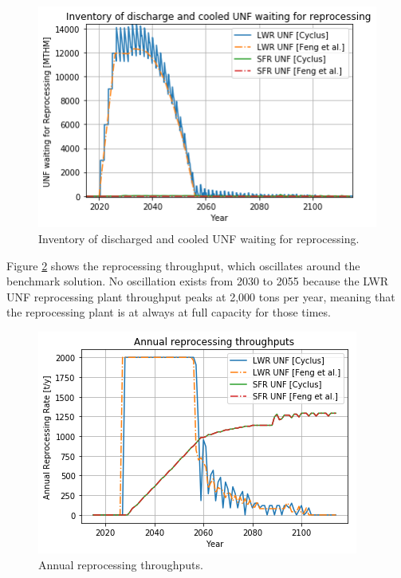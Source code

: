 \begin{figure}[htbp!]
	\begin{center}
		\includegraphics[scale=0.7]{./images/results_18/waiting_monthly.png}
	\end{center}
	\caption{Inventory of discharged and cooled \gls{UNF} waiting for reprocessing.}
	\label{fig:waiting_monthly}
\end{figure}


Figure \ref{fig:rep} shows the reprocessing throughput, which oscillates around
the benchmark solution. No oscillation exists from 2030 to 2055 because the
\gls{LWR} \gls{UNF} reprocessing plant throughput peaks at 2,000 tons per year,
meaning that the reprocessing plant is at always at full capacity for those times.

\begin{figure}[htbp!]
	\begin{center}
		\includegraphics[scale=0.7]{./images/results_18/rep.png}
	\end{center}
	\caption{Annual reprocessing throughputs.}
	\label{fig:rep}
\end{figure}


